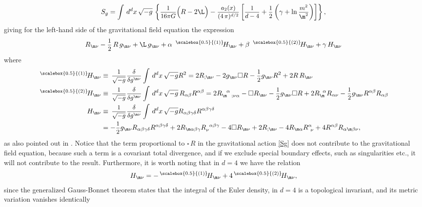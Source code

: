 \documentclass[a4paper,11pt,openright,twoside]{book}
\let\a=\alpha   \let\b=\beta   \let\g=\gamma   \let\d=\delta
\let\n=\nu      \let\x=\xi     \let\p=\pi      \let\r=\rho
\newcommand{\sdfrac}[2]{\mbox{\small$\displaystyle\frac{#1}{#2}$}}
\numberwithin{equation}{section}
\begin{document}
{{{{		\begin{equation}
			S_g=\int\,d^dx\,\sqrt{-g}\,\left\{\sdfrac{1}{16\pi G}\Big(R-2\L\Big)-\sdfrac{a_2(x)}{(4\,\pi)^{d/2}}\left[\sdfrac{1}{d-4}+\sdfrac{1}{2}\left(\g+\ln\sdfrac{m^2}{\m^2}\right)\right]\right\}\label{Sg},
		\end{equation}
		giving for the left-hand side of the gravitational field equation the expression
		\begin{equation}
			R_{\m\n}-\sdfrac{1}{2}\,R\,g_{\m\n}+\L\,g_{\m\n}+\a\ \,^{\substack{\scalebox{0.5}{(1)}}}\!H_{\m\n}+\b\ \,^{\substack{\scalebox{0.5}{(2)}}}\!H_{\m\n}+\g\,H_{\m\n}\label{eqgrav}
		\end{equation}
		where 
		\begin{equation}
			\begin{split}
				\,^{\substack{\scalebox{0.5}{(1)}}}\!H_{\m\n}&\equiv\,\sdfrac{1}{\sqrt{-g}}\sdfrac{\d}{\d g^{\m\n}}\int\,d^dx\,\sqrt{-g}R^2=2R_{;\m\n}-2g_{\m\n}\square R-\sdfrac{1}{2}g_{\m\n}R^2+2R\,R_{\m\n}\\
				\,^{\substack{\scalebox{0.5}{(2)}}}\!H_{\m\n}&\equiv \,\sdfrac{1}{\sqrt{-g}}\sdfrac{\d}{\d g^{\m\n}}\int\,d^dx\,\sqrt{-g}\,R_{\a\b}R^{\a\b}=2R_{\m\ \ ;\n\a}^{\ \ \a}-\square R_{\m\n}-\sdfrac{1}{2}g_{\m\n}\square R+2R_\m^{\ \,\a}R_{\a\n}-\sdfrac{1}{2}g_{\m\n}R^{\a\b}R_{\a\b}\\
				H_{\m\n}&\equiv\,\sdfrac{1}{\sqrt{-g}}\sdfrac{\d}{\d g^{\m\n}}\int\,d^dx\,\sqrt{-g}R_{\a\b\g\d}R^{\a\b\g\d}\notag\\
				&=-\sdfrac{1}{2}g_{\m\n}R_{\a\b\g\d}R^{\a\b\g\d}+2R_{\m\a\b\g}R_\n^{\ \,\a\b\g}-4\square R_{\m\n}+2R_{;\m\n}-4R_{\m\a}R^\a_{\ \n}+4R^{\a\b}R_{\a\m\b\n},
			\end{split}\label{HH}
		\end{equation}
		as also pointed out in \cite{Barth:1983hb}. Notice that the term proportional to $\square\,R$ in the gravitational action \eqref{Sg} does not contribute to the gravitational field equation, because such a term is a covariant total divergence, and if we exclude special boundary effects, such as singularities etc., it will not contribute to the result. Furthermore, it is worth noting that in $d=4$ we have the relation
		\begin{equation}
			H_{\m\n}=-\,^{\substack{\scalebox{0.5}{(1)}}}\!H_{\m\n}+4\,^{\substack{\scalebox{0.5}{(2)}}}\!H_{\m\n},\label{ind}
		\end{equation}
		since the generalized Gauss-Bonnet theorem states that the integral of the Euler density, in $d=4$ is a topological invariant, and its metric variation vanishes identically
}}}}
\end{document}
